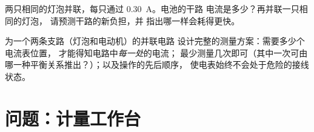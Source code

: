 \begin{exercise}[$\star\star$]\label{exo:g8:intensity-ammeter:11}
两只相同的灯泡并联，每只通过 \qty{0.30}{A}。电池的干路
电流是多少？再并联一只相同的灯泡，
请预测干路的新负担，并
指出哪一样会耗得更快。
\end{exercise}

\begin{exercise}[$\star\star\star$]\label{exo:g8:intensity-ammeter:12}
为一个两条支路（灯泡和电动机）的并联电路
设计完整的测量方案：需要多少个电流表位置，
才能得知电路中\emph{每一处}的电流；
最少测量几次即可（其中一次可由
哪一种平衡关系推出？）；以及操作的先后顺序，
使电表始终不会处于危险的接线状态。
\end{exercise}

\section{问题：计量工作台}

